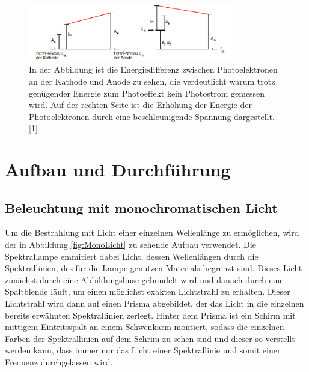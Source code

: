 \documentclass[titlepage = firstcover]{scrartcl}
\begin{document}
        \FloatBarrier

                \begin{figure}[h]
                  \centering
                  \includegraphics[width = 0.8\textwidth]{Bilder/bSpannug.png}
                  \caption{In der Abbildung ist die Energiedifferenz zwischen Photoelektronen an der Kathode und Anode zu sehen, die verdeutlicht warum trotz genügender Energie zum Photoeffekt kein Photostrom gemessen wird. Auf der rechten Seite ist die Erhöhung der Energie der Photoelektronen durch eine beschleunigende Spannung dargestellt. [1]}
                  \label{fig:bSpannung}
                \end{figure}

        \FloatBarrier

        \noindent



    \newpage
    \section{Aufbau und Durchführung}
        \subsection{Beleuchtung mit monochromatischen Licht}
            Um die Bestrahlung mit Licht einer einzelnen Wellenlänge zu ermöglichen, wird der in Abbildung \ref{fig:MonoLicht} zu sehende Aufbau verwendet. Die Spektrallampe emmitiert dabei Licht, dessen Wellenlängen 
            durch die Spektrallinien, des für die Lampe genutzen Materials begrenzt sind. Dieses Licht zunächst durch eine Abbildungslinse gebündelt wird und danach durch eine Spaltblende läuft, um 
            einen möglichst exakten Lichtstrahl zu erhalten. Dieser Lichtstrahl wird dann auf einen Prisma abgebildet, der das Licht in die einzelnen bereits erwähnten Spektrallinien zerlegt. Hinter 
            dem Prisma ist ein Schirm mit mittigem Eintritsspalt an einem Schwenkarm montiert, sodass die einzelnen Farben der Spektrallinien auf dem Schrim zu sehen sind und dieser so verstellt werden
            kann, dass immer nur das Licht einer Spektrallinie und somit einer Frequenz durchgelassen wird.
            
\end{document}
